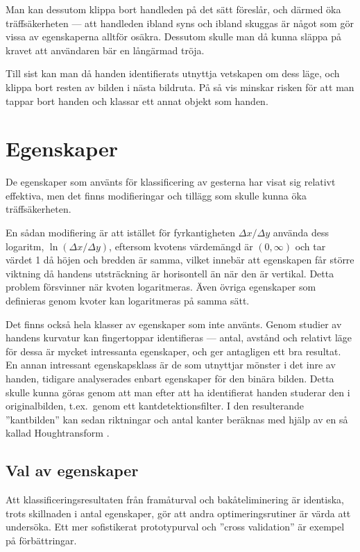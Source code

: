 \documentclass[../rapport_MVEX01-11-05]{subfiles}
\begin{document}
Man kan dessutom klippa bort handleden på det sätt
 föreslår, och därmed öka träffsäkerheten --- att
handleden ibland syns och ibland skuggas är något som gör vissa av 
egenskaperna alltför osäkra. Dessutom skulle man då kunna släppa på kravet
att användaren bär en långärmad tröja.

Till sist kan man då handen identifierats utnyttja
vetskapen om dess läge, och
klippa bort resten av bilden i nästa bildruta.
På så vis minskar risken för att man tappar bort handen och
klassar ett annat objekt som handen.

\section{Egenskaper}
De egenskaper som använts för klassificering av gesterna har visat sig relativt
effektiva, men det finns modifieringar och tillägg som skulle kunna
öka träffsäkerheten. 

En sådan modifiering är att istället för fyrkantigheten $\Delta
x/\Delta y$ använda dess logaritm, $\ln(\Delta x/\Delta
y)$, eftersom kvotens värdemängd är $(0,\infty)$ och tar värdet 1 då
höjen och bredden är samma, vilket innebär att egenskapen får större
viktning då handens utsträckning är horisontell än när den är vertikal. Detta problem
försvinner när kvoten logaritmeras. Även övriga egenskaper som
definieras genom kvoter kan logaritmeras på samma sätt.

Det finns också hela klasser av egenskaper som inte använts.
Genom studier av handens kurvatur kan fingertoppar 
identifieras --- antal, avstånd och relativt läge för dessa är
mycket intressanta egenskaper, och ger antagligen ett bra resultat.
En annan intressant egenskapsklass är de som utnyttjar mönster i det
inre av handen, tidigare analyserades enbart egenskaper för den binära bilden.
Detta skulle kunna göras
genom att man efter att ha identifierat handen studerar den
i originalbilden, t.ex.~genom ett kantdetektionsfilter.
I den resulterande ''kantbilden'' kan sedan riktningar och antal kanter
beräknas med hjälp av en så kallad Houghtransform \cite{Duda72}.

\subsection{Val av egenskaper}
Att klassificeringsresultaten från framåturval och bakåteliminering är 
identiska, trots skillnaden i antal egenskaper, gör att andra
optimeringsrutiner är värda att undersöka.
Ett mer sofistikerat prototypurval och ''cross validation'' är exempel
på förbättringar.
\end{document}

